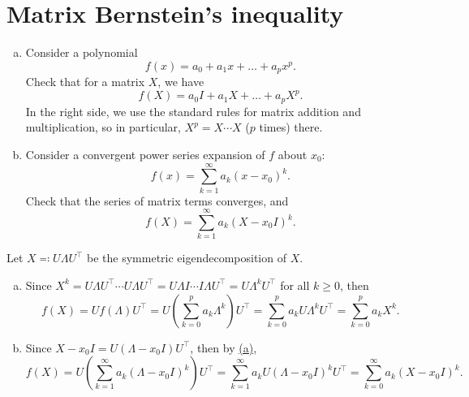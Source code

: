 
\section{Matrix Bernstein's inequality}
\begin{problem*}[Exercise 5.4.3]\label{ex5.4.3}
	\begin{enumerate}[(a)]
		\item\label{ex5.4.3:a} Consider a polynomial
		      \[
			      f(x)
			      = a_0 + a_1 x + \dots + a_p x^p.
		      \]
		      Check that for a matrix \(X\), we have
		      \[
			      f(X)
			      = a_0 I + a_1 X + \dots + a_p X^p .
		      \]
		      In the right side, we use the standard rules for matrix addition and multiplication, so in particular, \(X^p = X \cdots X\) (\(p\) times) there.
		\item\label{ex5.4.3:b} Consider a convergent power series expansion of \(f\) about \(x_0\):
		      \[
			      f(x)
			      = \sum_{k=1}^{\infty} a_k (x - x_0)^k.
		      \]
		      Check that the series of matrix terms converges, and
		      \[
			      f(X)
			      = \sum_{k=1}^{\infty} a_k (X - x_0 I)^k.
		      \]
	\end{enumerate}
\end{problem*}
\begin{answer}
	Let \(X\eqqcolon U\varLambda U^{\top}\) be the symmetric eigendecomposition of \(X\).
	\begin{enumerate}[(a)]
		\item Since \(X^k = U \varLambda U^{\top} \cdots U\varLambda U^{\top}=U\varLambda I\cdots I\varLambda U^{\top}=U\varLambda ^kU^{\top}\) for all \(k\geq 0\), then
		      \[
			      f(X)
			      = U f(\varLambda ) U^{\top}
			      =U\left( \sum_{k=0}^pa_k\varLambda ^k \right) U^{\top}
			      = \sum_{k=0}^{p} a_k U\varLambda ^k U^{\top}
			      =\sum_{k=0}^{p} a_k X^k.
		      \]
		\item Since \(X - x_0 I = U(\varLambda -x_0 I) U^{\top}\), then by \hyperref[ex5.4.3:a]{(a)},
		      \[
			      f(X)
			      = U \left( \sum_{k=1}^{\infty} a_k (\varLambda -x_0 I)^k \right) U^{\top}
			      =\sum_{k=1}^{\infty} a_k U(\varLambda -x_0 I)^k U^{\top}
			      =\sum_{k=0}^{\infty} a_k(X-x_0 I)^k.
		      \]
	\end{enumerate}
\end{answer}

